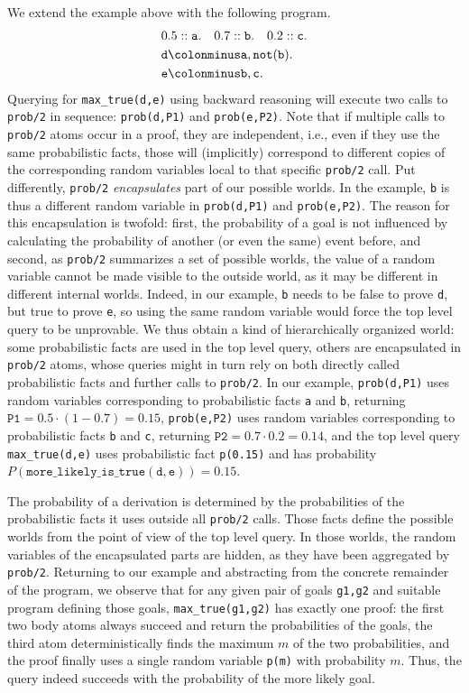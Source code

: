 \documentclass[a4paper]{article}
\begin{document}
We extend the example above with the following program.
\begin{align*}
&0.5::\mathtt{a}.~~~0.7::\mathtt{b}.~~~0.2::\mathtt{c}.\\
&\mathtt{d}\colonminus \mathtt{a,not(b)}.\\
&\mathtt{e}\colonminus \mathtt{b,c}.
\end{align*}
Querying for \verb|max_true(d,e)| using backward reasoning will execute two  calls to \verb|prob/2| in sequence: \verb|prob(d,P1)| and \verb|prob(e,P2)|.  
Note that if multiple calls to  \verb|prob/2|  atoms occur in a proof,
they are independent, i.e., even if they use the same probabilistic facts, those will (implicitly) correspond to different copies of the corresponding random variables local to that specific \verb|prob/2| call. Put differently, \verb|prob/2| \emph{encapsulates} part of our possible worlds. In the example, \verb|b| is thus a different random variable in \verb|prob(d,P1)| and \verb|prob(e,P2)|. 
The reason for this encapsulation is twofold: first, the probability of a goal is not influenced by calculating the probability of another (or even the same) event before, and second, as \verb|prob/2| summarizes a set of possible worlds, the value of a random variable cannot be made visible to the outside world, as it may be different in different internal worlds. Indeed, in our example, \verb|b| needs to be false to prove \verb|d|, but true to prove \verb|e|, so using the same random variable would force the top level query to be unprovable. 
We thus obtain a kind of hierarchically organized world: some probabilistic facts are used in the top level query, others are encapsulated in \verb|prob/2| atoms, whose queries might in turn rely on both directly called probabilistic facts and further calls to \verb|prob/2|.  In our example, \verb|prob(d,P1)| uses random variables corresponding to probabilistic facts \verb|a| and \verb|b|, returning $\mathtt{P1}=0.5\cdot (1-0.7) = 0.15$,  \verb|prob(e,P2)| uses random variables corresponding to probabilistic facts \verb|b| and \verb|c|, returning $\mathtt{P2}=0.7\cdot 0.2 = 0.14$, and  the top level query \verb|max_true(d,e)| uses probabilistic fact \verb|p(0.15)| and has probability $P(\mathtt{more\_likely\_is\_true(d,e)}) = 0.15$.

The probability of a derivation is determined by the probabilities of
the probabilistic facts it uses outside all \verb|prob/2| calls. Those
facts define the possible worlds from the point of view of the top
level query. In those worlds, the random variables of the encapsulated
parts are hidden, as they have been aggregated by
\verb|prob/2|. Returning to our example and abstracting from the
concrete remainder of the program, we observe that for any given pair of goals \verb|g1,g2| and suitable program defining those goals, \verb|max_true(g1,g2)| has exactly one proof: the first two body atoms always succeed and return the probabilities of the goals, the third atom deterministically finds the maximum $m$ of the two probabilities,  and the proof finally uses a single random variable \verb|p(m)| with probability $m$. Thus, the query indeed  succeeds with the probability of the more likely goal. 
\end{document}
